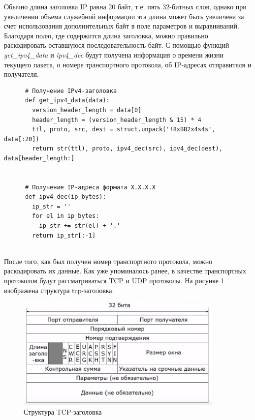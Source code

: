 \documentclass[bachelor, och, coursework]{SCWorks}
\begin{document}
    Обычно длина заголовка IP равна 20 байт, т.е. пять 32-битных слов, однако при увеличении объема служебной информации эта длина может быть увеличена
    за счет использования дополнительных байт в поле параметров и выравниваний. Благодаря полю, где содержится
    длина заголовка, можно правильно раскодировать оставшуюся последовательность байт. С помощью функций \textit{get\_ipv4\_data} и \textit{ipv4\_dec}
    будут получена информация о времени жизни текущего пакета, о номере транспортного протокола, об IP-адресах отправителя и получателя.
  
    \begin{verbatim}
      # Получение IPv4-заголовка
      def get_ipv4_data(data):
        version_header_length = data[0]
        header_length = (version_header_length & 15) * 4
        ttl, proto, src, dest = struct.unpack('!8xBB2x4s4s', data[:20])
        return str(ttl), proto, ipv4_dec(src), ipv4_dec(dest), data[header_length:]
      
      
      # Получение IP-адреса формата X.X.X.X
      def ipv4_dec(ip_bytes):
        ip_str = ''
        for el in ip_bytes:
          ip_str += str(el) + '.'
        return ip_str[:-1]
      
    \end{verbatim}

    После того, как был получен номер транспортного протокола, можно раскодировать их данные. Как уже упоминалось ранее,
    в качестве транспортных протоколов будут рассматриваться TCP и UDP протоколы. На рисунке \ref{tcp-header} изображена структура tcp-заголовка.
  
    \begin{figure}[H]
      \centering
      \includegraphics[width=0.9\textwidth]{photo/tcp-segment.jpg}
      \caption{Структура TCP-заголовка}
      \label{tcp-header}
    \end{figure}
    
\end{document}
